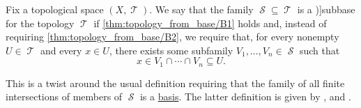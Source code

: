 \begin{definition}\label{def:topological_subbase}\mimprovised
  Fix a topological space \( (X, \mscrT) \). We say that the family \( \mscrS \subseteq \mscrT \) is a \term[ru=предбаза (\cite[def. 4.7]{Александров1977ОбщаяТопология})]{subbase} for the topology \( \mscrT \) if \ref{thm:topology_from_base/B1} holds and, instead of requiring \ref{thm:topology_from_base/B2}, we require that, for every nonempty \( U \in \mscrT \) and every \( x \in U \), there exists some subfamily \( V_1, \ldots, V_n \in \mscrS \) such that
  \begin{equation}\label{eq:def:topological_subbase}
    x \in V_1 \cap \cdots \cap V_n \subseteq U.
  \end{equation}
\end{definition}
\begin{comments}
  \item This is a twist around the usual definition requiring that the family of all finite intersections of members of \( \mscrS \) is a \hyperref[def:topological_base]{basis}. The latter definition is given by \textcite[12]{Engelking1989GeneralTopology}, \textcite[48]{Kelley1975GeneralTopology} and \textcite[def. 4.7]{Александров1977ОбщаяТопология}.
\end{comments}

